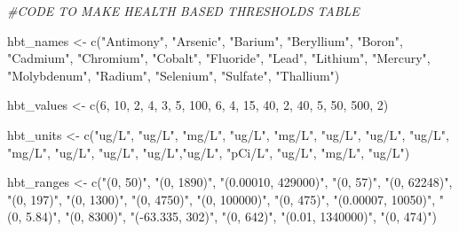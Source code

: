 \documentclass[12pt, twoside]{amherstthesis}
\newenvironment{Shaded}{\begin{snugshade}}{\end{snugshade}}
\newcommand{\CommentTok}[1]{\textcolor[rgb]{0.56,0.35,0.01}{\textit{#1}}}
\newcommand{\DecValTok}[1]{\textcolor[rgb]{0.00,0.00,0.81}{#1}}
\newcommand{\FunctionTok}[1]{\textcolor[rgb]{0.00,0.00,0.00}{#1}}
\newcommand{\NormalTok}[1]{#1}
\newcommand{\OtherTok}[1]{\textcolor[rgb]{0.56,0.35,0.01}{#1}}
\newcommand{\StringTok}[1]{\textcolor[rgb]{0.31,0.60,0.02}{#1}}
\begin{document}
\begin{Shaded}
\begin{Highlighting}[]
\CommentTok{\#CODE TO MAKE HEALTH BASED THRESHOLDS TABLE}

\NormalTok{hbt\_names }\OtherTok{\textless{}{-}} \FunctionTok{c}\NormalTok{(}\StringTok{"Antimony"}\NormalTok{, }\StringTok{"Arsenic"}\NormalTok{, }\StringTok{"Barium"}\NormalTok{, }\StringTok{"Beryllium"}\NormalTok{,}
               \StringTok{"Boron"}\NormalTok{, }\StringTok{"Cadmium"}\NormalTok{, }\StringTok{"Chromium"}\NormalTok{, }\StringTok{"Cobalt"}\NormalTok{, }\StringTok{"Fluoride"}\NormalTok{,}
               \StringTok{"Lead"}\NormalTok{, }\StringTok{"Lithium"}\NormalTok{, }\StringTok{"Mercury"}\NormalTok{, }\StringTok{"Molybdenum"}\NormalTok{,}
               \StringTok{"Radium"}\NormalTok{, }\StringTok{"Selenium"}\NormalTok{, }\StringTok{"Sulfate"}\NormalTok{, }\StringTok{"Thallium"}\NormalTok{)}

\NormalTok{hbt\_values }\OtherTok{\textless{}{-}} \FunctionTok{c}\NormalTok{(}\DecValTok{6}\NormalTok{, }\DecValTok{10}\NormalTok{, }\DecValTok{2}\NormalTok{, }\DecValTok{4}\NormalTok{, }
                \DecValTok{3}\NormalTok{, }\DecValTok{5}\NormalTok{, }\DecValTok{100}\NormalTok{, }\DecValTok{6}\NormalTok{, }\DecValTok{4}\NormalTok{,}
                \DecValTok{15}\NormalTok{, }\DecValTok{40}\NormalTok{, }\DecValTok{2}\NormalTok{, }\DecValTok{40}\NormalTok{, }
                \DecValTok{5}\NormalTok{, }\DecValTok{50}\NormalTok{, }\DecValTok{500}\NormalTok{, }\DecValTok{2}\NormalTok{)}

\NormalTok{hbt\_units }\OtherTok{\textless{}{-}} \FunctionTok{c}\NormalTok{(}\StringTok{"ug/L"}\NormalTok{, }\StringTok{"ug/L"}\NormalTok{, }\StringTok{"mg/L"}\NormalTok{, }\StringTok{"ug/L"}\NormalTok{, }
               \StringTok{"mg/L"}\NormalTok{, }\StringTok{"ug/L"}\NormalTok{, }\StringTok{"ug/L"}\NormalTok{, }\StringTok{"ug/L"}\NormalTok{, }\StringTok{"mg/L"}\NormalTok{,}
               \StringTok{"ug/L"}\NormalTok{, }\StringTok{"ug/L"}\NormalTok{, }\StringTok{"ug/L"}\NormalTok{,}\StringTok{"ug/L"}\NormalTok{, }
               \StringTok{"pCi/L"}\NormalTok{, }\StringTok{"ug/L"}\NormalTok{, }\StringTok{"mg/L"}\NormalTok{, }\StringTok{"ug/L"}\NormalTok{)}

\NormalTok{hbt\_ranges }\OtherTok{\textless{}{-}} \FunctionTok{c}\NormalTok{(}\StringTok{"(0, 50)"}\NormalTok{, }\StringTok{"(0, 1890)"}\NormalTok{, }\StringTok{"(0.00010, 429000)"}\NormalTok{, }\StringTok{"(0, 57)"}\NormalTok{,}
               \StringTok{"(0, 62248)"}\NormalTok{, }\StringTok{"(0, 197)"}\NormalTok{, }\StringTok{"(0, 1300)"}\NormalTok{, }\StringTok{"(0, 4750)"}\NormalTok{, }
               \StringTok{"(0, 100000)"}\NormalTok{, }\StringTok{"(0, 475)"}\NormalTok{, }\StringTok{"(0.00007, 10050)"}\NormalTok{, }
               \StringTok{"(0, 5.84)"}\NormalTok{, }\StringTok{"(0, 8300)"}\NormalTok{, }\StringTok{"({-}63.335, 302)"}\NormalTok{, }
               \StringTok{"(0, 642)"}\NormalTok{, }\StringTok{"(0.01, 1340000)"}\NormalTok{, }\StringTok{"(0, 474)"}\NormalTok{)}


\end{Highlighting}
\end{Shaded}
\end{document}
